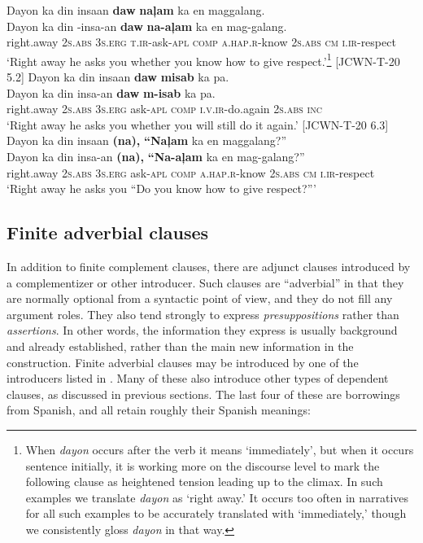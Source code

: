 \ea
\label{bkm:Ref474410675}
Dayon  ka  din  insaan  \textbf{daw}  \textbf{naļam}  ka  en  maggalang. \smallskip\\
\gll Dayon  ka  din  \emptyset{}-insa-an  \textbf{daw}  \textbf{na-aļam}  ka  en  mag-galang. \\
right.away  2\textsc{s.abs}  3\textsc{s.erg}  \textsc{t.ir}-ask-\textsc{apl}  \textsc{comp}  \textsc{a.hap.r}-know  2\textsc{s.abs}  \textsc{cm}  \textsc{i.ir}-respect \\
\glt ‘Right away he asks you whether you know how to give respect.’\footnote{When \textit{dayon} occurs after the verb it means ‘immediately’, but when it occurs sentence initially, it is working more on the discourse level to mark the following clause as heightened tension leading up to the climax. In such examples we translate \textit{dayon} as ‘right away.’ It occurs too often in narratives for all such examples to be accurately translated with ‘immediately,’ though we consistently gloss \textit{dayon} in that way.} [JCWN-T-20 5.2]
\z
\ea
\label{bkm:Ref474410677}
Dayon  ka  din  insaan  \textbf{daw}  \textbf{misab}  ka  pa. \smallskip\\
\gll Dayon  ka  din  insa-an  \textbf{daw}  \textbf{m-isab}  ka  pa. \\
right.away  2\textsc{s.abs}  3\textsc{s.erg}  ask-\textsc{apl}  \textsc{comp}  \textsc{i.v.ir}-do.again  2\textsc{s.abs}  \textsc{inc} \\
\glt ‘Right away he asks you whether you will still do it again.’ [JCWN-T-20 6.3]
\z
\ea
\label{bkm:Ref116120188}
Dayon  ka  din  insaan  \textbf{(na),}  \textbf{“Naļam}  ka  en maggalang?” \smallskip\\
\gll Dayon  ka  din  insa-an  \textbf{(na),}  \textbf{“Na-aļam}  ka  en mag-galang?” \\
right.away  2\textsc{s.abs}  3\textsc{s.erg}  ask-\textsc{apl}  \textsc{comp}  \textsc{a.hap.r}-know  2\textsc{s.abs}  \textsc{cm}
\textsc{i.ir}-respect \\
\glt `Right away he asks you “Do you know how to give respect?”’
\z
\subsection{Finite adverbial clauses}
\label{bkm:Ref460483264} \label{sec:finiteadverbialclauses}

In addition to finite complement clauses, there are adjunct clauses introduced by a complementizer or other introducer. Such clauses are “adverbial” in that they are normally optional from a syntactic point of view, and they do not fill any argument roles. They also tend strongly to express \textit{presuppositions} rather than \textit{assertions}. In other words, the information they express is usually background and already established, rather than the main new information in the construction. Finite adverbial clauses may be introduced by one of the introducers listed in . Many of these also introduce other types of dependent clauses, as discussed in previous sections. The last four of these are borrowings from Spanish, and all retain roughly their Spanish meanings:


